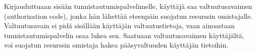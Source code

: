 Kirjauduttuaan sisään tunnistautumispalvelimelle, käyttäjä saa valtuutusavaimen (authorization code), jonka hän lähettää eteenpäin suojatun resurssin omistajalle. Valtuutusavain ei pidä sisällään käyttäjän valtuutustietoja, vaan ainoastaan tunnistautumispalvelin osaa lukea sen. Saatuaan valtuutusavaimen käyttäjältä, voi suojatun resurssin omistaja hakea pääsyvaltuuden käyttäjän tietoihin.